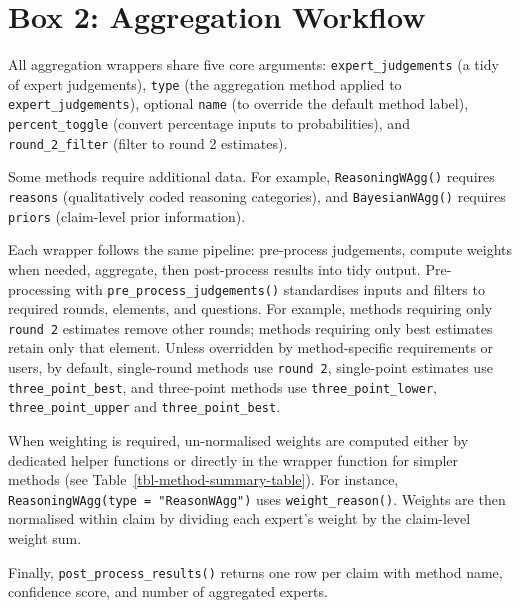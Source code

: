\documentclass[
  11pt,
  a4paper,
]{article}
\begin{document}
\begin{tcolorbox}[enhanced jigsaw, arc=.35mm, bottomrule=.15mm, breakable, colback=white, colframe=quarto-callout-color-frame, left=2mm, leftrule=.75mm, opacityback=0, rightrule=.15mm, toprule=.15mm]

\protect{}\label{aggWorkflow}
\section*{Box 2: Aggregation Workflow}\label{box-2-aggregation-workflow}

All  aggregation wrappers share five core arguments:
\texttt{expert\_judgements} (a tidy  of expert
judgements), \texttt{type} (the aggregation method applied to
\texttt{expert\_judgements}), optional \texttt{name} (to override the
default method label), \texttt{percent\_toggle} (convert percentage
inputs to probabilities), and \texttt{round\_2\_filter} (filter to round
2 estimates).

Some methods require additional data. For example,
\texttt{ReasoningWAgg()} requires \texttt{reasons} (qualitatively coded
reasoning categories), and \texttt{BayesianWAgg()} requires
\texttt{priors} (claim-level prior information).

Each wrapper follows the same pipeline: pre-process judgements, compute
weights when needed, aggregate, then post-process results into tidy
output. Pre-processing with \texttt{pre\_process\_judgements()}
standardises inputs and filters to required rounds, elements, and
questions. For example, methods requiring only \texttt{round\ 2}
estimates remove other rounds; methods requiring only best estimates
retain only that element. Unless overridden by method-specific
requirements or users, by default, single-round methods use
\texttt{round\ 2}, single-point estimates use
\texttt{three\_point\_best}, and three-point methods use
\texttt{three\_point\_lower}, \texttt{three\_point\_upper} and
\texttt{three\_point\_best}.

When weighting is required, un-normalised weights are computed either by
dedicated helper functions or directly in the wrapper function for
simpler methods (see Table~\ref{tbl-method-summary-table}). For
instance, \texttt{ReasoningWAgg(type\ =\ "ReasonWAgg")} uses
\texttt{weight\_reason()}. Weights are then normalised within claim by
dividing each expert's weight by the claim-level weight sum.

Finally, \texttt{post\_process\_results()} returns one row per claim
with method name, confidence score, and number of aggregated experts.

\end{tcolorbox}
\end{document}

